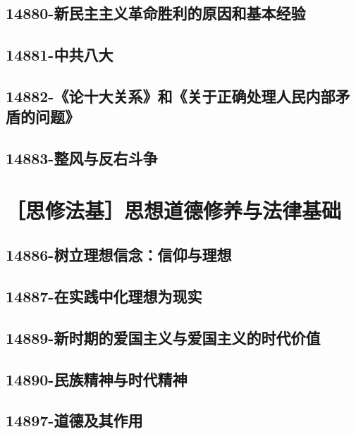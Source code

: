 \subsection{14880-新民主主义革命胜利的原因和基本经验}

\subsection{14881-中共八大}

\subsection{14882-《论十大关系》和《关于正确处理人民内部矛盾的问题》}

\subsection{14883-整风与反右斗争}



\section{［思修法基］思想道德修养与法律基础}


\subsection{14886-树立理想信念：信仰与理想}

\subsection{14887-在实践中化理想为现实}

\subsection{14889-新时期的爱国主义与爱国主义的时代价值}

\subsection{14890-民族精神与时代精神}

\subsection{14897-道德及其作用}



